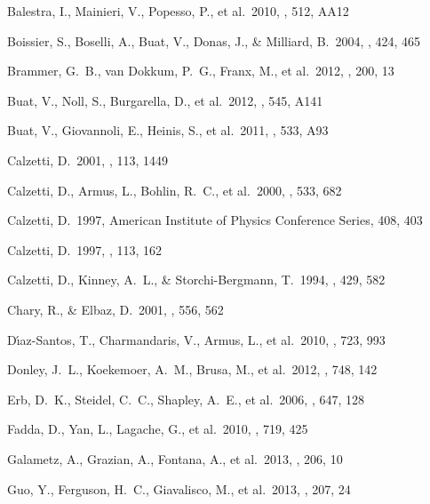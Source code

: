 \documentclass[preprint]{aastex}
\begin{document}
\begin{thebibliography}

 Balestra, I., Mainieri, V., Popesso,
P., et al.\ 2010, \aap, 512, AA12

 Boissier, S., Boselli, A.,
Buat, V., Donas, J., \& Milliard, B.\ 2004, \aap, 424, 465

 Brammer, G.~B., van 
Dokkum, P.~G., Franx, M., et al.\ 2012, \apjs, 200, 13

 Buat, V., Noll, S., Burgarella, D.,
et al.\ 2012, \aap, 545, A141 

 Buat, V., Giovannoli, E., Heinis, S.,
et al.\ 2011, \aap, 533, A93 

 Calzetti, D.\ 2001, \pasp, 113, 1449

 Calzetti, D., Armus, L., Bohlin,
R.~C., et al.\ 2000, \apj, 533, 682

 Calzetti, D.\ 1997, American 
Institute of Physics Conference Series, 408, 403

 Calzetti, D.\ 1997, \aj, 113, 162

 Calzetti, D., Kinney, A.~L., \&
Storchi-Bergmann, T.\ 1994, \apj, 429, 582

 Chary, R., \& Elbaz, D.\ 2001, \apj,
556, 562

 D{\'{\i}}az-Santos, T.,
Charmandaris, V., Armus, L., et al.\ 2010, \apj, 723, 993

 Donley, J.~L., Koekemoer, A.~M.,
Brusa, M., et al.\ 2012, \apj, 748, 142

 Erb, D.~K., Steidel, C.~C., 
Shapley, A.~E., et al.\ 2006, \apj, 647, 128

 Fadda, D., Yan, L., 
Lagache, G., et al.\ 2010, \apj, 719, 425

 Galametz, A., Grazian, A.,
Fontana, A., et al.\ 2013, \apjs, 206, 10

 Guo, Y., Ferguson, H.~C., 
Giavalisco, M., et al.\ 2013, \apjs, 207, 24


\end{thebibliography}
\end{document}

